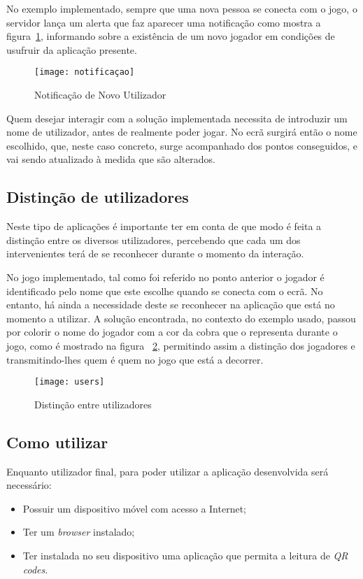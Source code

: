 	No exemplo implementado, sempre que uma nova pessoa se conecta com o jogo, o servidor lança um alerta que faz aparecer uma notificação como mostra a figura~\ref{fig:novo}, informando sobre a existência de um novo jogador em condições de usufruir da aplicação presente. 
	
	\begin{figure}[ht]
		\centering
		\texttt{[image: notificaçao]}
		\caption[Novo Utilizador] {Notificação de Novo Utilizador}
		\label{fig:novo}
	\end{figure}

	Quem desejar interagir com a solução implementada necessita de introduzir um nome de utilizador, antes de realmente poder jogar. No ecrã surgirá então o nome escolhido, que, neste caso concreto, surge acompanhado dos pontos conseguidos, e vai sendo atualizado à medida que são alterados.
	

	\subsection{Distinção de utilizadores}

	Neste tipo de aplicações é importante ter em conta de que modo é feita a distinção entre os diversos utilizadores, percebendo que cada um dos intervenientes terá de se reconhecer durante o momento da interação. 

	No jogo implementado, tal como foi referido no ponto anterior o jogador é identificado pelo nome que este escolhe quando se conecta com o ecrã. No entanto, há ainda a necessidade deste se reconhecer na aplicação que está no momento a utilizar. A solução encontrada, no contexto do exemplo usado, passou por colorir o nome do jogador com a cor da cobra que o representa durante o jogo, como é mostrado na figura ~\ref{fig:user}, permitindo assim a distinção dos jogadores e transmitindo-lhes quem é quem no jogo que está a decorrer.

	\begin{figure}[ht]
		\centering
		\texttt{[image: users]}
		\caption[Distinção de Utilizadores]{Distinção entre utilizadores}
		\label{fig:user}
	\end{figure}

	\subsection{Como utilizar}

	Enquanto utilizador final, para poder utilizar a aplicação desenvolvida será necessário:
	\begin{itemize}
		\item Possuir um dispositivo móvel com acesso a Internet;
		\item Ter um \textit{browser} instalado;
		\item Ter instalada no seu dispositivo uma aplicação que permita a leitura de \textit{QR codes}.
	\end{itemize}

